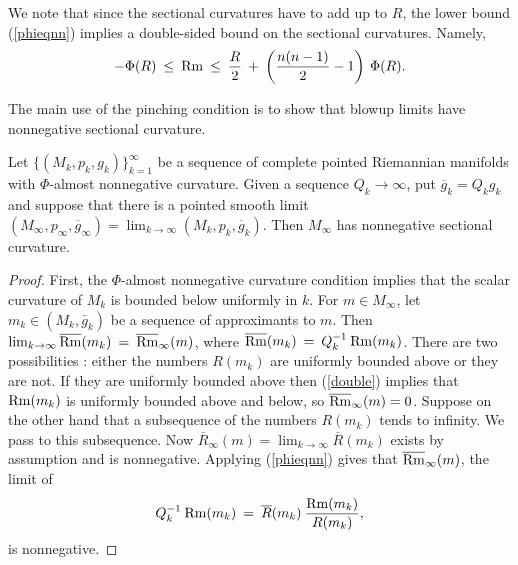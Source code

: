 We note that since the sectional curvatures have to add up to
$R$, the lower bound (\ref{phieqnn}) implies a double-sided bound on the
sectional curvatures.  Namely,
\begin{equation} \label{double}
- \Phi(R) \: \le \:
\operatorname{Rm} \: \le \: \frac{R}{2} \: + \: \left( \frac{n(n-1)}{2} - 1 \right)
\: \Phi(R).
\end{equation}

The main use of the pinching condition is to show that
blowup limits have nonnegative sectional curvature.

\begin{lemma}
  \label{lem:kl-canonical-neighborhood-theorem-convergence-canonical-neighborhoods}
 \label{almost nonneg}
Let $\{(M_k, p_k, {g}_k)\}_{k=1}^\infty$ be a sequence of
complete pointed Riemannian manifolds with $\Phi$-almost
nonnegative curvature.
Given a sequence $Q_k \rightarrow \infty$, put
$\overline{g}_k = Q_k g_k$ and
suppose that there
is a pointed smooth limit
$(M_\infty, p_\infty, \overline{g}_\infty) = \lim_{k \rightarrow \infty}
(M_k, p_k, \overline{g}_k)$. Then
$M_\infty$ has nonnegative sectional curvature.
\end{lemma}
\begin{proof}
First, the $\Phi$-almost
nonnegative curvature condition implies that the scalar
curvature of $M_k$ is bounded below uniformly in $k$.
For $m \in M_\infty$, let $m_k \in (M_k,\bar g_k)$ be
a sequence of approximants to $m$.  Then
$\lim_{k \rightarrow \infty} \overline{\operatorname{Rm}}(m_k) \: = \:
\overline{\operatorname{Rm}}_\infty(m)$, where $\overline{\operatorname{Rm}}(m_k) \: = \:
Q_k^{-1} \: {\operatorname{Rm}}(m_k)$.
There are two possibilities : either the numbers $R(m_k)$ are
uniformly bounded above or they are not.  If they are uniformly
bounded above then (\ref{double}) implies that
$\operatorname{Rm}(m_k)$ is uniformly bounded above and below,
so $\overline{\operatorname{Rm}}_\infty(m)
= 0$. Suppose on the other hand that a subsequence of the numbers
$R(m_k)$ tends to infinity.  We pass to this subsequence. Now
$\overline{R}_\infty(m) = \lim_{k \rightarrow \infty} \overline{R}(m_k)$
exists by assumption and is nonnegative.
Applying (\ref{phieqnn})
gives that $\overline{\operatorname{Rm}}_\infty(m)$, the limit of
\begin{equation}
Q_k^{-1} \: {\operatorname{Rm}}(m_k) \: = \:
\overline{R}(m_k) \: \frac{{\operatorname{Rm}}(m_k)}{R(m_k)},
\end{equation}
is nonnegative.
\end{proof}


